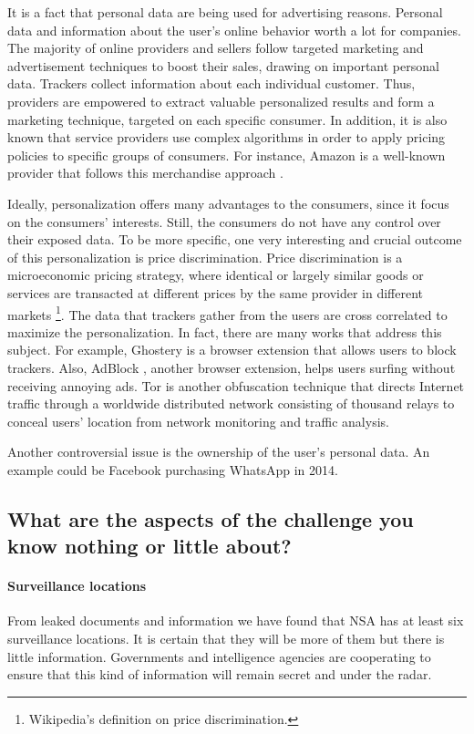 It is a fact that personal data are being used for advertising reasons. 
Personal data and information about the user's online behavior worth a lot for 
companies. The majority of online providers and sellers follow targeted 
marketing and advertisement techniques to boost their sales, drawing on 
important personal data. Trackers collect information about each individual 
customer. Thus, providers are empowered to extract valuable personalized results 
and form a marketing technique, targeted on each specific consumer.
In addition, it is also known that service providers use complex algorithms
in order to apply pricing policies to specific groups of consumers.
For instance, Amazon is a well-known provider that follows this merchandise 
approach \cite{chen2016empirical}. 

Ideally, personalization offers many advantages to the consumers, since it focus
on the consumers' interests. Still, the consumers do not have any control over 
their exposed data. To be more specific, one very interesting and crucial 
outcome of this personalization is price discrimination. Price discrimination is 
a microeconomic pricing strategy, where identical or largely similar goods or 
services are transacted at different prices by the same provider in different 
markets \footnote{Wikipedia's definition on price discrimination.}.
The data that trackers gather from the users are cross correlated to maximize 
the personalization. In fact, there are many works that address this subject. 
For example, Ghostery \cite{ghostery} is a browser extension that allows users
to block trackers. Also, AdBlock \cite{adblock}, another browser extension,  
helps users surfing without receiving annoying ads. Tor \cite{syverson2004tor} 
is another obfuscation technique that directs Internet traffic through a 
worldwide distributed network consisting of thousand relays to conceal users’ 
location from network monitoring and traffic analysis. 

Another controversial issue is the ownership of the user's personal data.
An example could be Facebook purchasing WhatsApp in 2014. 

\subsection{What are the aspects of the challenge you know nothing or little 
about?}

\paragraph{Surveillance locations}
From leaked documents and information we have found that NSA has at least six 
surveillance locations. It is certain that they will be more of them but there 
is little information. Governments and intelligence agencies are cooperating to 
ensure that this kind of information will remain secret and under the radar.

